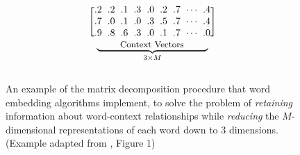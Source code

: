 \begin{figure}[ht!]
\[\begin{blockarray}{c@{\hspace{2mm}}c@{\hspace{2mm}}c@{\hspace{2mm}}c@{\hspace{2mm}}c@{\hspace{2mm}}c@{\hspace{2mm}}c@{\hspace{2mm}}c@{\hspace{2mm}}c}
\begin{block}{[c@{\hspace{2mm}}c@{\hspace{2mm}}c@{\hspace{2mm}}c@{\hspace{2mm}}c@{\hspace{2mm}}c@{\hspace{2mm}}c@{\hspace{2mm}}c@{\hspace{2mm}}c]}
			.2 & .2 & .1 & .3 & .0 & .2 & .7 & \cdots & .4 \\
			.7 & .0 & .1 & .0 & .3 & .5 & .7 & \cdots & .4 \\
			.9 & .8 & .6 & .3 & .0 & .1 & .7 & \cdots & .0 \\
		\end{block}
		\BAmulticolumn{9}{c}{\underbrace{\small\text{\phantom{Conte}Context Vectors}\phantom{Conte}}_{3 \times M}} \\
	\end{blockarray}
	\]
	\caption{An example of the matrix decomposition procedure that word embedding algorithms implement, to solve the problem of \textit{retaining} information about word-context relationships while \textit{reducing} the $M$-dimensional representations of each word down to 3 dimensions. (Example adapted from \cite{kozlowski_geometry_2019}, Figure 1)}
	\label{fig:kozlowski-decomposition}
\end{figure}